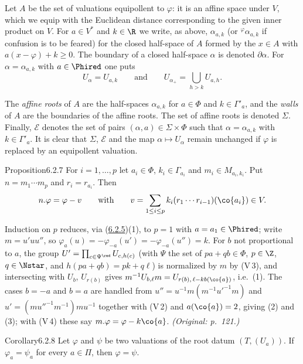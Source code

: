 \documentclass[12pt,a4paper,oneside,english]{smfart}
\makeatletter
\newcommand{\btanchor}[1]{\leavevmode\Hy@raisedlink{\hypertarget{bt:#1}{}}}
\newcommand{\btref}[1]{\hyperlink{bt:#1}{#1}}
\theoremstyle{definition}
\theoremstyle{bt}
\makeatother
\begin{document}
\btanchor{6.2.6} Let $A$ be the set of valuations equipollent to $\varphi$: it is an
affine space under $V$, which we equip with the Euclidean distance corresponding
to the given inner product on $V$. For $a\in V^{*}$ and $k\in\R$ we write, as
above, $\alpha_{a,k}$ (or ${}^{\varphi}\alpha_{a,k}$ if confusion is to be feared)
for the closed half-space of $A$ formed by the $x\in A$ with $a(x-\varphi)+k\ge0$.
The boundary of a closed half-space $\alpha$ is denoted $\partial\alpha$. For
$\alpha=\alpha_{a,k}$ with $a\in\Phired$ one puts
\[ U_\alpha=U_{a,k}\qquad\text{and}\qquad U_{\alpha_{+}}=\bigcup_{h>k}U_{a,h}. \]

The \emph{affine roots} of $A$ are the half-spaces $\alpha_{a,k}$ for $a\in\Phi$
and $k\in\Gamma'_a$, and the \emph{walls} of $A$ are the boundaries of the affine
roots. The set of affine roots is denoted $\Sigma$. Finally, $\mathscr{E}$ denotes
the set of pairs $(\alpha,a)\in\Sigma\times\Phi$ such that $\alpha=\alpha_{a,k}$
with $k\in\Gamma'_a$. It is clear that $\Sigma$, $\mathscr{E}$ and the map
$\alpha\mapsto U_\alpha$ remain unchanged if $\varphi$ is replaced by an
equipollent valuation.

\begin{stmt}{Proposition}{6.2.7}\btanchor{6.2.7}
For $i=1,\dots,p$ let $a_i\in\Phi$, $k_i\in\Gamma_{a_i}$ and
$m_i\in M_{a_i,k_i}$. Put $n=m_1\cdots m_p$ and $r_i=r_{a_i}$. Then
\[ n.\varphi=\varphi-v\qquad\text{with}\qquad
   v=\sum_{1\le i\le p}k_i(r_1\cdots r_{i-1})(\co{a_i})\in V. \]
\end{stmt}

\begin{sketch}
Induction on $p$ reduces, via (\btref{6.2.5})(1), to $p=1$ with $a=a_1\in\Phired$; write
$m=u'uu''$, so $\varphi_a(u)=-\varphi_{-a}(u')=-\varphi_{-a}(u'')=k$.
For $b$ not proportional to $a$, the group
$U'=\prod_{c\in\Psi^{\red}}U_{c,h(c)}$ (with $\Psi$ the set of $pa+qb\in\Phi$,
$p\in\Z$, $q\in\Nstar$, and $h(pa+qb)=pk+q\ell$) is normalized by $m$ by (V\,3),
and intersecting with $U_b$, $U_{r(b)}$ gives
$m^{-1}U_{b,\ell}m=U_{r(b),\,\ell-kb(\co{a})}$, i.e.\ (1). The cases $b=-a$ and
$b=a$ are handled from $u''=u^{-1}m(m^{-1}u'^{-1}m)$ and
$u'=(mu''^{-1}m^{-1})mu^{-1}$ together with (V\,2) and $a(\co{a})=2$, giving (2)
and (3); with (V\,4) these say $m.\varphi=\varphi-k\co{a}$.
\emph{(Original: p.~121.)}
\end{sketch}

\begin{stmt}{Corollary}{6.2.8}\btanchor{6.2.8}
Let $\varphi$ and $\psi$ be two valuations of the root datum $(T,(U_a))$. If
$\varphi_a=\psi_a$ for every $a\in\Pi$, then $\varphi=\psi$.
\end{stmt}
\end{document}
